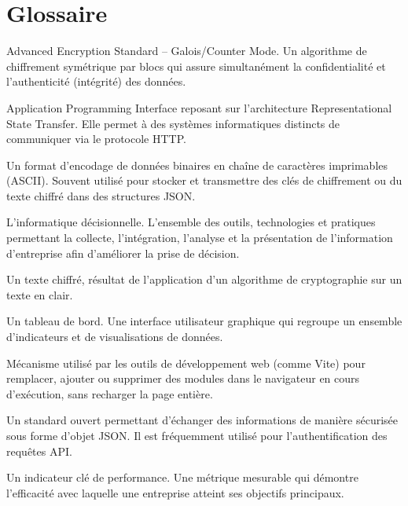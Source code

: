 ﻿\documentclass[12pt,a4paper,oneside]{report} %
\begin{document}
\newpage
\chapter*{Glossaire}

\begin{description}[labelwidth=3cm, leftmargin=3.5cm, style=nextline]
    \item[\textbf{AES-GCM}] Advanced Encryption Standard – Galois/Counter Mode. Un algorithme de chiffrement symétrique par blocs qui assure simultanément la confidentialité et l'authenticité (intégrité) des données.
    \item[\textbf{API REST}] Application Programming Interface reposant sur l'architecture Representational State Transfer. Elle permet à des systèmes informatiques distincts de communiquer via le protocole HTTP.
    \item[\textbf{Base64}] Un format d'encodage de données binaires en chaîne de caractères imprimables (ASCII). Souvent utilisé pour stocker et transmettre des clés de chiffrement ou du texte chiffré dans des structures JSON.
    \item[\textbf{Business Intelligence (BI)}] L'informatique décisionnelle. L'ensemble des outils, technologies et pratiques permettant la collecte, l'intégration, l'analyse et la présentation de l'information d'entreprise afin d'améliorer la prise de décision.
    \item[\textbf{Ciphertext}] Un texte chiffré, résultat de l'application d'un algorithme de cryptographie sur un texte en clair.
    \item[\textbf{Dashboard}] Un tableau de bord. Une interface utilisateur graphique qui regroupe un ensemble d'indicateurs et de visualisations de données.
    \item[\textbf{HMR (Hot Module Replacement)}] Mécanisme utilisé par les outils de développement web (comme Vite) pour remplacer, ajouter ou supprimer des modules dans le navigateur en cours d'exécution, sans recharger la page entière.
    \item[\textbf{JWT (JSON Web Token)}] Un standard ouvert permettant d'échanger des informations de manière sécurisée sous forme d'objet JSON. Il est fréquemment utilisé pour l'authentification des requêtes API.
    \item[\textbf{KPI (Key Performance Indicator)}] Un indicateur clé de performance. Une métrique mesurable qui démontre l'efficacité avec laquelle une entreprise atteint ses objectifs principaux.

\end{description}
\end{document}
